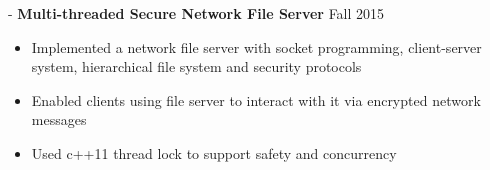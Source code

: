\documentclass[12pt]{res}
\begin{document}
\begin{resume}
\begin{itemize}[leftmargin=-0.1in]
\end{itemize}\vspace{-10pt}
   

 -\sectionwidth \resumewidth
 \textbf{Multi-threaded Secure Network File Server}   \hfill{Fall 2015} \hspace{-0.58in}\vspace{-0mm}\\
  \vspace{-14pt}
 \begin{itemize}[leftmargin=-0.1in]
  \item Implemented a network file server with socket programming, client-server system, hierarchical file system and security protocols\vspace{-4pt}
  \item Enabled clients using file server to interact with it via encrypted network messages \vspace{-4pt}
  \item Used c++11 thread lock to support safety and concurrency\vspace{-3pt}
  \end{itemize}\vspace{-10pt}
   


\end{resume}
\end{document}
